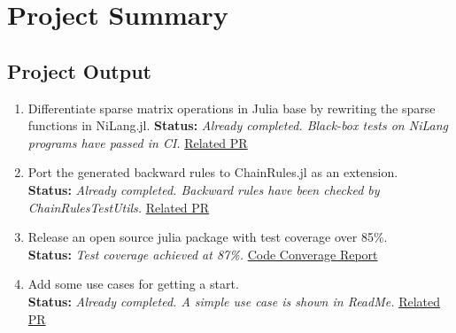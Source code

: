 
\vspace{0.5cm}  

\section{Project Summary}
\subsection{Project Output}
\begin{enumerate}[(1)]
    \item Differentiate sparse matrix operations in Julia base by rewriting the sparse functions in NiLang.jl.  
    \textbf{Status: } \textit{Already completed. Black-box tests on NiLang programs have passed in CI.}  
    \href{https://github.com/jieli-matrix/SparseArraysAD.jl/pull/20}{Related PR}
    \item Port the generated backward rules to ChainRules.jl as an extension. \\ 
    \textbf{Status: } \textit{Already completed. Backward rules have been checked by ChainRulesTestUtils.}  
    \href{https://github.com/jieli-matrix/SparseArraysAD.jl/pull/39}{Related PR}
    \item Release an open source julia package with test coverage over 85\%.  \\
    \textbf{Status: } \textit{Test coverage achieved at 87\%.} 
    \href{https://app.codecov.io/gh/jieli-matrix/SparseArraysAD.jl}{Code Converage Report} 
    \item Add some use cases for getting a start.  \\
    \textbf{Status: } \textit{Already completed. A simple use case is shown in ReadMe.}  
    \href{https://github.com/jieli-matrix/SparseArraysAD.jl/pull/34}{Related PR}
\end{enumerate}
